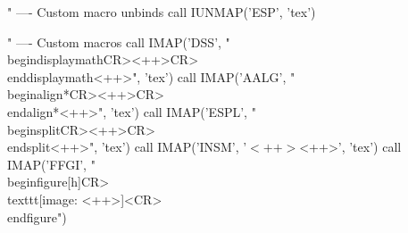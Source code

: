 " ---- Custom macro unbinds
call IUNMAP('ESP', 'tex')

" ---- Custom macros
call IMAP('DSS', "\\begin{displaymath}\<CR><++>\<CR>\\end{displaymath}<++>", 'tex')
call IMAP('AALG', "\\begin{align*}\<CR><++>\<CR>\\end{align*}<++>", 'tex')
call IMAP('ESPL', "\\begin{split}\<CR><++>\<CR>\\end{split}<++>", 'tex')
call IMAP('INSM', '$<++>$<++>', 'tex')
call IMAP('FFGI', "\\begin{figure}[h]\<CR>\\texttt{[image: <++>]}<CR>\\end{figure}")

